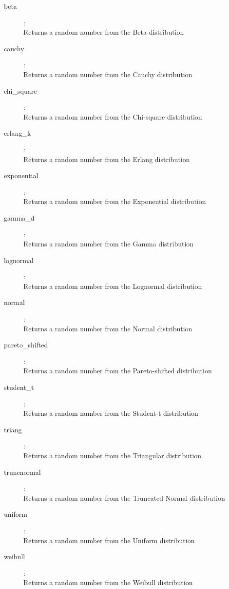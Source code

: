 \begin{description}
\item[beta]:  \\
    Returns a random number from the Beta distribution
\item[cauchy]:  \\
    Returns a random number from the Cauchy distribution
\item[chi\_square]:  \\
    Returns a random number from the Chi-square distribution
\item[erlang\_k]:  \\
    Returns a random number from the Erlang distribution
\item[exponential]:  \\
    Returns a random number from the Exponential distribution
\item[gamma\_d]:  \\
    Returns a random number from the Gamma distribution
\item[lognormal]:  \\
    Returns a random number from the Lognormal distribution
\item[normal]:  \\
    Returns a random number from the Normal distribution
\item[pareto\_shifted]:  \\
    Returns a random number from the Pareto-shifted distribution
\item[student\_t]:  \\
    Returns a random number from the Student-t distribution
\item[triang]:  \\
    Returns a random number from the Triangular distribution
\item[truncnormal]:  \\
    Returns a random number from the Truncated Normal distribution
\item[uniform]:  \\
    Returns a random number from the Uniform distribution
\item[weibull]:  \\
    Returns a random number from the Weibull distribution

\end{description}

